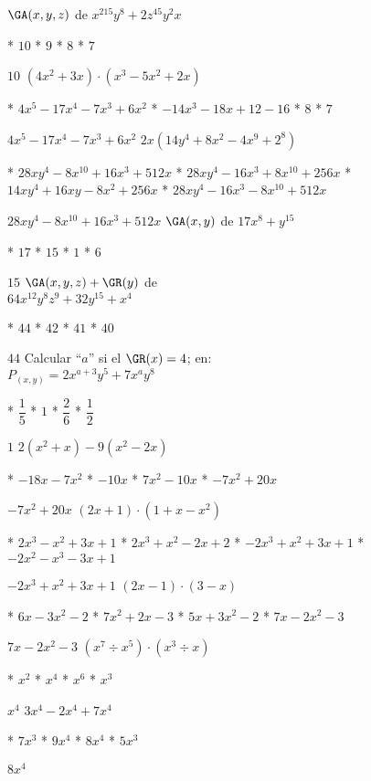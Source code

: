 $\GA(x,y,z)$ de $x^215y^8+2z^45y^2x$
\begin{enum}
	* $10$
	* $9$
	* $8$
	* $7$
\end{enum}
$10$
$\left(4x^2+3x\right)\cdot\left(x^3-5x^2+2x\right)$
\begin{enum}
	* $4x^5-17x^4-7x^3+6x^2$
	* $-14x^3-18x+12-16$
	* $8$
	* $7$
\end{enum}
$4x^5-17x^4-7x^3+6x^2$
$2x\left(14y^4+8x^2-4x^9+2^8\right)$
\begin{enum}
	* $28xy^4-8x^{10}+16x^3+512x$
	* $28xy^4-16x^3+8x^{10}+256x$
	* $14xy^4+16xy-8x^2+256x$
	* $28xy^4-16x^3-8x^{10}+512x$
\end{enum}
$28xy^4-8x^{10}+16x^3+512x$
$\GA(x,y)$ de $17x^8+y^{15}$
\begin{enum}
	* $17$
	* $15$
	* $1$
	* $6$
\end{enum}
$15$
$\GA(x,y,z)+\GR(y)$ de \\
$64x^{12}y^8z^9+32y^{15}+x^4$
\begin{enum}
	* $44$
	* $42$
	* $41$
	* $40$
\end{enum}
$44$
Calcular ``$a$'' si el $\GR(x)=4$; en: \\
$P_{(x,y)}=2x^{a+3}y^5+7x^ay^8$
\begin{task}
	* $\dfrac{1}{5}$
	* $1$
	* $\dfrac{2}{6}$
	* $\dfrac{1}{2}$
\end{task}
$1$
$2\left(x^2+x\right)-9\left(x^2-2x\right)$
\begin{enum}
	* $-18x-7x^2$
	* $-10x$
	* $7x^2-10x$
	* $-7x^2+20x$
\end{enum}
$-7x^2+20x$
$(2x+1)\cdot\left(1+x-x^2\right)$
\begin{enum}
	* $2x^3-x^2+3x+1$
	* $2x^3+x^2-2x+2$
	* $-2x^3+x^2+3x+1$
	* $-2x^2-x^3-3x+1$
\end{enum}
$-2x^3+x^2+3x+1$
$(2x-1)\cdot(3-x)$
\begin{enum}
	* $6x-3x^2-2$
	* $7x^2+2x-3$
	* $5x+3x^2-2$
	* $7x-2x^2-3$
\end{enum}
$7x-2x^2-3$
$\left(x^7\div x^5\right)\cdot\left(x^3\div x\right)$
\begin{enum}
	* $x^2$
	* $x^4$
	* $x^6$
	* $x^3$
\end{enum}
$x^4$
$3x^4-2x^4+7x^4$
\begin{enum}
	* $7x^3$
	* $9x^4$
	* $8x^4$
	* $5x^3$
\end{enum}
$8x^4$
